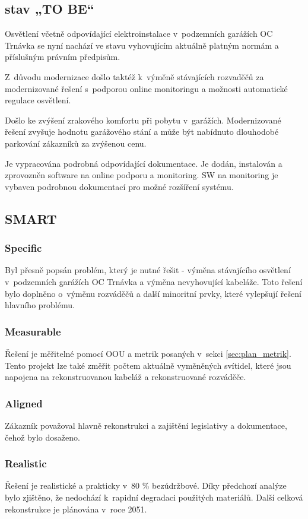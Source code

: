 \documentclass[a4paper, twoside, 11pt]{article}
\begin{document}
	\subsection{stav „TO BE“}
		Osvětlení včetně odpovídající elektroinstalace v~podzemních garážích OC Trnávka se nyní nachází ve stavu vyhovujícím aktuálně platným normám a příslušným právním předpisům. \par
		Z~důvodu modernizace došlo taktéž k~výměně stávajících rozvaděčů za modernizované řešení s~podporou online monitoringu a možnosti automatické regulace osvětlení.\par
		Došlo ke zvýšení zrakového komfortu při pobytu v~garážích. Modernizované řešení zvyšuje hodnotu garážového stání a může být nabídnuto dlouhodobé parkování zákazníků za zvýšenou cenu.\par
		Je vypracována podrobná odpovídající dokumentace. Je dodán, instalován a zprovozněn software na online podporu a monitoring. SW na monitoring je vybaven podrobnou dokumentací pro možné rozšíření systému.
	\subsection{SMART}
		\subsubsection{Specific}
			Byl přesně popsán problém, který je nutné řešit - výměna stávajícího osvětlení v~podzemních garážích OC Trnávka a výměna nevyhovující kabeláže. Toto řešení bylo doplněno o~výměnu rozváděčů a další minoritní prvky, které  vylepšují řešení hlavního problému.
		\subsubsection{Measurable}
			Řešení je měřitelné pomocí OOU a metrik posaných v~sekci \ref{sec:plan_metrik}. Tento projekt lze také změřit počtem aktuálně vyměněných svítidel, které jsou napojena na rekonstruovanou kabeláž a rekonstruované rozváděče.
		\subsubsection{Aligned}
			Zákazník považoval hlavně rekonstrukci a zajištění legislativy a dokumentace, čehož bylo dosaženo.
		\subsubsection{Realistic}
			Řešení je realistické a prakticky v~80 \% bezúdržbové. Díky předchozí analýze bylo zjištěno, že nedochází k~rapidní degradaci použitých materiálů. Další celková rekonstrukce je plánována v~roce 2051.
\end{document}
